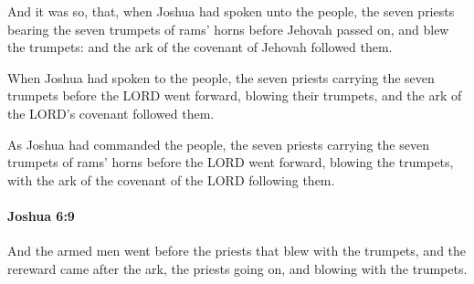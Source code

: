 			\begin{versebox}
					\item[BHS] 
					\item[ASV] And it was so, that, when Joshua had spoken unto the people, the seven priests bearing the seven trumpets of rams' horns before Jehovah passed on, and blew the trumpets: and the ark of the covenant of Jehovah followed them.
					\item[NIV] When Joshua had spoken to the people, the seven priests carrying the seven trumpets before the LORD went forward, blowing their trumpets, and the ark of the LORD’s covenant followed them.
					\item[NRSV] As Joshua had commanded the people, the seven priests carrying the seven trumpets of rams’ horns before the LORD went forward, blowing the trumpets, with the ark of the covenant of the LORD following them.
			\end{versebox}

		\paragraph{Joshua 6:9} %
			\label{JOSHUA-6-9}

			And the armed men went before the priests that blew with the trumpets, and the rereward came after the ark, the priests going on, and blowing with the trumpets.

